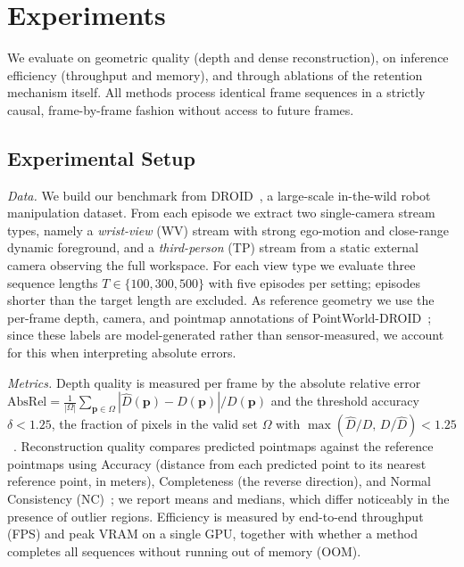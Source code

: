 \section{Experiments}
\label{sec:experiments}

We evaluate \method{} on geometric quality (depth and dense reconstruction), on inference efficiency (throughput and memory), and through ablations of the retention mechanism itself. All methods process identical frame sequences in a strictly causal, frame-by-frame fashion without access to future frames.

\subsection{Experimental Setup}
\label{sec:exp-setup}

\textit{Data.}
We build our benchmark from DROID~\cite{khazatsky2024droid}, a large-scale in-the-wild robot manipulation dataset. From each episode we extract two single-camera stream types, namely a \emph{wrist-view} (WV) stream with strong ego-motion and close-range dynamic foreground, and a \emph{third-person} (TP) stream from a static external camera observing the full workspace. For each view type we evaluate three sequence lengths $T\in\{100,300,500\}$ with five episodes per setting; episodes shorter than the target length are excluded.
As reference geometry we use the per-frame depth, camera, and pointmap annotations of PointWorld-DROID~\cite{huang2026pointworld}; since these labels are model-generated rather than sensor-measured, we account for this when interpreting absolute errors.

\textit{Metrics.}
Depth quality is measured per frame by the absolute relative error
$\mathrm{AbsRel}=\frac{1}{|\Omega|}\sum_{\mathbf{p}\in\Omega}|\hat{D}(\mathbf{p})-D(\mathbf{p})|/D(\mathbf{p})$
and the threshold accuracy $\delta{<}1.25$, the fraction of pixels in the valid set $\Omega$ with $\max(\hat{D}/D,\,D/\hat{D})<1.25$~\cite{eigen2014depth}.
Reconstruction quality compares predicted pointmaps against the reference pointmaps using Accuracy (distance from each predicted point to its nearest reference point, in meters), Completeness (the reverse direction), and Normal Consistency (NC)~\cite{yao2018mvsnet}; we report means and medians, which differ noticeably in the presence of outlier regions. Efficiency is measured by end-to-end throughput (FPS) and peak VRAM on a single GPU, together with whether a method completes all sequences without running out of memory (OOM).

